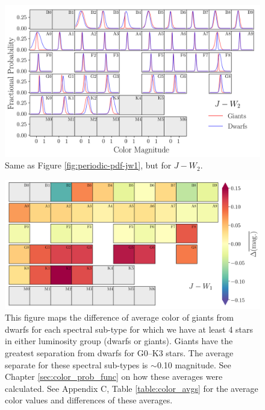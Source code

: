 \begin{figure}
    \centering
    \includegraphics[width=1.0\textwidth,clip=true]{Figures/periodic/periodic-t-pdf_J_W2.png}
    \caption{Same as Figure \ref{fig:periodic-pdf-jw1}, but for $J-W_{2}$.}
    \label{fig:periodic-pdf-jw2}
\end{figure}
\clearpage
\begin{figure}
    \centering
    \includegraphics[width=1.0\textwidth,clip=true]{Figures/periodic/periodic-delta_J_W1.png}
    \caption{This figure maps the difference of average color of giants from dwarfs for each spectral sub-type for which we have at least 4 stars in either luminosity group (dwarfs or giants). Giants have the greatest separation from dwarfs for G0--K3 stars. The average separate for these spectral sub-types is $\sim$0.10 magnitude. See Chapter \ref{sec:color_prob_func} on how these averages were calculated. See Appendix C, Table \ref{table:color_avgs} for the average color values and differences of these averages.}
    \label{fig:periodic-delta-jw1}
\end{figure}

